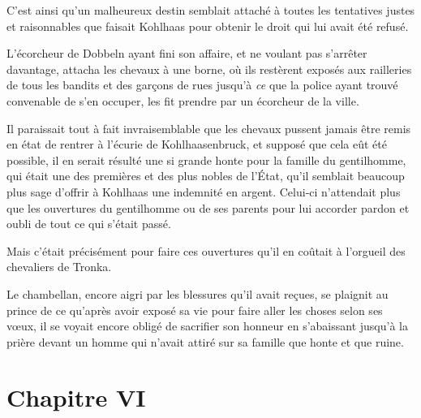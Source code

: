\documentclass[french,twoside]{book} %
\newcommand\chapteropen{} %
\newcommand\chapterclose{} %
\begin{document}
C’est ainsi qu’un malheureux destin semblait attaché à toutes les tentatives justes et raisonnables que faisait Kohlhaas pour obtenir le droit qui lui avait été refusé.\par
L’écorcheur de Dobbeln ayant fini son affaire, et ne voulant pas s’arrêter davantage, attacha les chevaux à une borne, où ils restèrent exposés aux railleries de tous les bandits et des garçons de rues jusqu’à \emph{ce} que la police ayant trouvé convenable de s’en occuper, les fit prendre par un écorcheur de la ville.\par
Il paraissait tout à fait invraisemblable que les chevaux pussent jamais être remis en état de rentrer à l’écurie de Kohlhaasenbruck, et supposé que cela eût été possible, il en serait résulté une si grande honte pour la famille du gentilhomme, qui était une des premières et des plus nobles de l’État, qu’il semblait beaucoup plus sage d’offrir à Kohlhaas une indemnité en argent. Celui-ci n’attendait plus que les ouvertures du gentilhomme ou de ses parents pour lui accorder pardon et oubli de tout ce qui s’était passé.\par
Mais c’était précisément pour faire ces ouvertures qu’il en coûtait à l’orgueil des chevaliers de Tronka.\par
Le chambellan, encore aigri par les blessures qu’il avait reçues, se plaignit au prince de ce qu’après avoir exposé sa vie pour faire aller les choses selon ses vœux, il se voyait encore obligé de sacrifier son honneur en s’abaissant jusqu’à la prière devant un homme qui n’avait attiré sur sa famille que honte et que ruine.
\chapterclose


\chapteropen
\chapter[{Chapitre VI}]{Chapitre VI}\renewcommand{\leftmark}{Chapitre VI}
\end{document}
